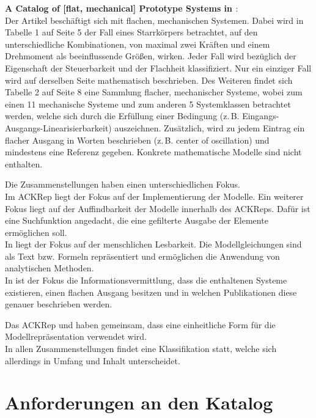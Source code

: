 \textbf{A Catalog of [flat, mechanical] Prototype Systems in \cite{MURASL95}}:\\
Der Artikel \cite{MURASL95} beschäftigt sich mit flachen, mechanischen Systemen. Dabei wird in Tabelle 1 auf Seite 5 der Fall eines Starrkörpers betrachtet, auf den unterschiedliche Kombinationen, von maximal zwei Kräften und einem Drehmoment als beeinflussende Größen, wirken. Jeder Fall wird bezüglich der Eigenschaft der Steuerbarkeit und der Flachheit klassifiziert. Nur ein einziger Fall wird auf derselben Seite mathematisch beschrieben. Des Weiteren findet sich Tabelle 2 auf Seite 8 eine Sammlung flacher, mechanischer Systeme, wobei zum einen 11 mechanische Systeme und zum anderen 5 Systemklassen betrachtet werden, welche sich durch die Erfüllung einer Bedingung (z.\,B. Eingangs-Ausgangs-Linearisierbarkeit) auszeichnen. Zusätzlich, wird zu jedem Eintrag ein flacher Ausgang in Worten beschrieben (z.\,B. center of oscillation) und mindestens eine Referenz gegeben. Konkrete mathematische Modelle sind nicht enthalten.

Die Zusammenstellungen haben einen unterschiedlichen Fokus.\\
Im ACKRep liegt der Fokus auf der Implementierung der Modelle. Ein weiterer Fokus liegt auf der Auffindbarkeit der Modelle innerhalb des ACKReps. Dafür ist eine Suchfunktion angedacht, die eine gefilterte Ausgabe der Elemente ermöglichen soll.\\
In \cite{LIYU13} liegt der Fokus auf der menschlichen Lesbarkeit. Die Modellgleichungen sind als Text bzw. Formeln repräsentiert und ermöglichen die Anwendung von analytischen Methoden. \\
In \cite{MURASL95} ist der Fokus die Informationsvermittlung, dass die enthaltenen Systeme existieren, einen flachen Ausgang besitzen und in welchen Publikationen diese genauer beschrieben werden.

Das ACKRep und \cite{LIYU13} haben gemeinsam, dass eine einheitliche Form für die Modellrepräsentation verwendet wird. \\
In allen Zusammenstellungen findet eine Klassifikation statt, welche sich allerdings in Umfang und Inhalt unterscheidet.

\section{Anforderungen an den Katalog} 
\label{Ch:Vorbetrachtung:Sec:Anforderungen}

